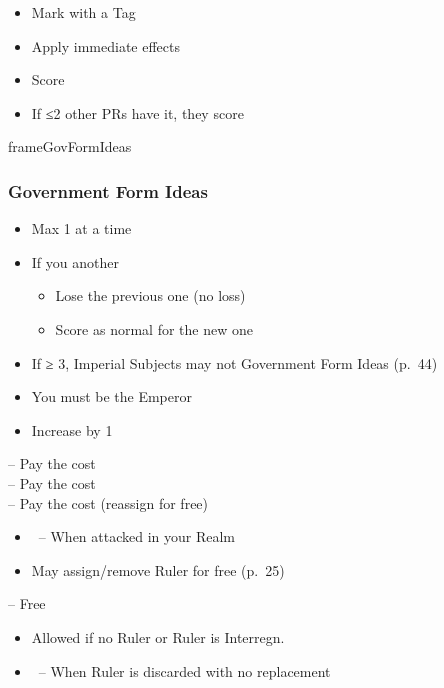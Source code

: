 \documentclass[10pt]{article}
\newlength{\fhGovFormIdeas} \setlength\fhGovFormIdeas{7\baselineskip}
\begin{document}
\begin{itemize}
	\item Mark with a Tag
	\item Apply immediate effects
	\item Score 
	\item If ≤2 other PRs have it, they score 
\end{itemize}
\begin{dynamiccontents*}{frameGovFormIdeas}\begin{eubox}{\fhGovFormIdeas}
	\subsubsection*{Government Form Ideas }
	\begin{itemize}
		\item Max 1 at a time
		\item If you  another
		\begin{itemize}
			\item Lose the previous one (no \prestige loss)
			\item Score \prestige as normal for the new one
		\end{itemize}
		\item If \authority ≥ 3, Imperial Subjects may not  Government Form Ideas (p.~44)
	\end{itemize}
\end{eubox}\end{dynamiccontents*}

\framebreak
{}
\begin{itemize}
	\item You must be the Emperor
	\item Increase \authority by 1
\end{itemize}

 -- Pay the \ducat cost\\
 -- Pay the \milpower cost\\
 -- Pay the \milpower cost (reassign for free)\\
\begin{itemize}
	\item \reaction~-- When attacked in your Realm
	\item May assign/remove Ruler for free (p.~25)
\end{itemize}
 -- Free
\begin{itemize}
	\item Allowed if no Ruler or Ruler is \dprime Interregn.\dprime
	\item \reaction~-- When Ruler is discarded with no replacement
\end{itemize}
\end{document}
